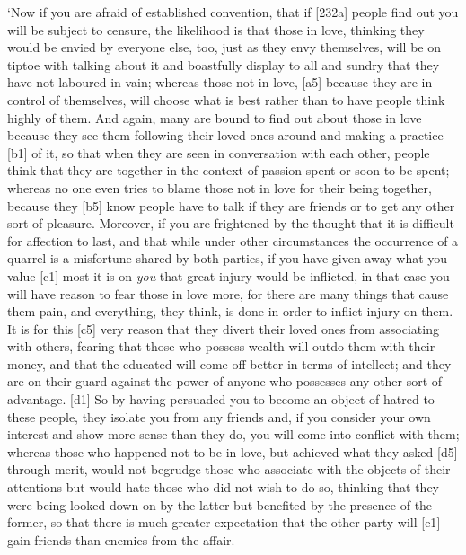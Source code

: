 ‘Now if you are afraid of established convention, that if {[}232a{]}
people find out you will be subject to censure, the likelihood is that
those in love, thinking they would be envied by everyone else, too, just
as they envy themselves, will be on tiptoe with talking about it and
boastfully display to all and sundry that they have not laboured in
vain; whereas those not in love, {[}a5{]} because they are in control of
themselves, will choose what is best rather than to have people think
highly of them. And again, many are bound to find out about those in
love because they see them following their loved ones around and making
a practice {[}b1{]} of it, so that when they are seen in conversation
with each other, people think that they are together in the context of
passion spent or soon to be spent; whereas no one even tries to blame
those not in love for their being together, because they {[}b5{]} know
people have to talk if they are friends or to get any other sort of
pleasure. Moreover, if you are frightened by the thought that it is
difficult for affection to last, and that while under other
circumstances the occurrence of a quarrel is a misfortune shared by both
parties, if you have given away what you value {[}c1{]} most it is on
{\em you} that great injury would be inflicted, in that case you will
have reason to fear those in love more, for there are many things that
cause them pain, and everything, they think, is done in order to inflict
injury on them. It is for this {[}c5{]} very reason that they divert
their loved ones from associating with others, fearing that those who
possess wealth will outdo them with their money, and that the educated
will come off better in terms of intellect; and they are on their guard
against the power of anyone who possesses any other sort of advantage.
{[}d1{]} So by having persuaded you to become an object of hatred to
these people, they isolate you from any friends and, if you consider
your own interest and show more sense than they do, you will come into
conflict with them; whereas those who happened not to be in love, but
achieved what they asked {[}d5{]} through merit, would not begrudge
those who associate with the objects of their attentions but would hate
those who did not wish to do so, thinking that they were being looked
down on by the latter but benefited by the presence of the former, so
that there is much greater expectation that the other party will
{[}e1{]} gain friends than enemies from the affair.

